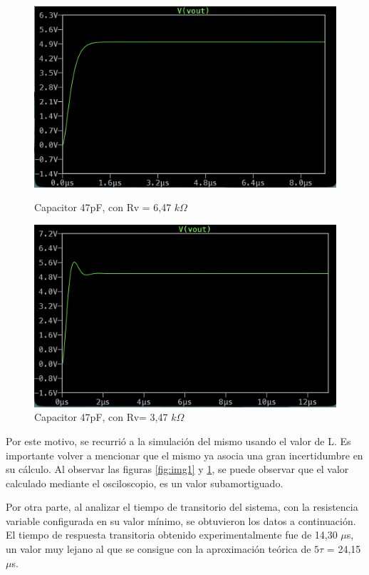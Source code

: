 \documentclass{article}
\begin{document}
        \begin{figure}[h!]
    \centering
    \begin{minipage}{0.49\textwidth}
        \centering
        \includegraphics[width=\linewidth]{CRIT2.png}
        \caption{Capacitor 47pF, con Rv = 6,47 $k\Omega$}
        \label{fig:img1}
    \end{minipage}\hfill
    \begin{minipage}{0.49\textwidth}
        \centering
        \includegraphics[width=\linewidth]{SUBAMORT1.png}
        \caption{Capacitor 47pF, con Rv= 3,47 $k\Omega$}
        \label{fig:img2}
    \end{minipage}
\end{figure}

        Por este motivo, se recurrió a la simulación del mismo usando el valor de L. Es importante volver a mencionar que el mismo ya asocia una gran incertidumbre en su cálculo. Al observar las figuras \ref{fig:img1} y \ref{fig:img2}, se puede observar que el valor calculado mediante el osciloscopio, es un valor subamortiguado. \par
        Por otra parte, al analizar el tiempo de transitorio del sistema, con la resistencia variable configurada en su valor mínimo, se obtuvieron los datos a continuación. El tiempo de respuesta transitoria obtenido experimentalmente fue de 14,30 $\mu$s, un valor muy lejano al que se consigue con la aproximación teórica de $5\tau$ = 24,15 $\mu$s. \par
        
\end{document}
